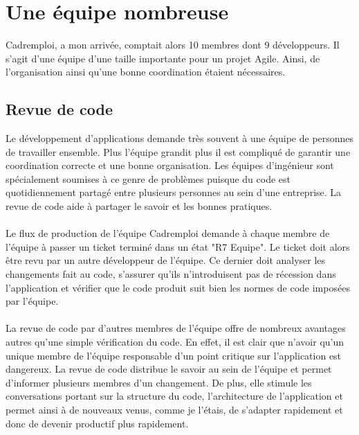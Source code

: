 \section{Une équipe nombreuse}
\label{sec:Une équipe nombreuse}
Cadremploi, a mon arrivée, comptait alors 10 membres dont 9 développeurs.
Il s'agit d'une équipe d'une taille importante pour un projet Agile.
Ainsi, de l'organisation ainsi qu'une bonne coordination étaient nécessaires.

\subsection{Revue de code}
\label{sub:Revue de code}
Le développement d'applications demande très souvent à une équipe de personnes de travailler ensemble.
Plus l'équipe grandit plus il est compliqué de garantir une coordination correcte et une bonne organisation.
Les équipes d'ingénieur sont spécialement soumises à ce genre de problèmes puisque du code est quotidiennement partagé entre plusieurs personnes au sein d'une entreprise.
La revue de code aide à partager le savoir et les bonnes pratiques.
\paragraph{}
Le flux de production de l'équipe Cadremploi demande à chaque membre de l'équipe à passer un ticket terminé dans un état "R7 Equipe".
Le ticket doit alors être revu par un autre développeur de l'équipe.
Ce dernier doit analyser les changements fait au code, s'assurer qu'ils n'introduisent pas de récession dans l'application et vérifier que le code produit suit bien les normes de code imposées par l'équipe.
\paragraph{}
La revue de code par d'autres membres de l'équipe offre de nombreux avantages autres qu'une simple vérification du code.
En effet, il est clair que n'avoir qu'un unique membre de l'équipe responsable d'un point critique sur l'application est dangereux.
La revue de code distribue le savoir au sein de l'équipe et permet d'informer plusieurs membres d'un changement.
De plus, elle stimule les conversations portant sur la structure du code, l'architecture de l'application et permet ainsi à de nouveaux venus, comme je l'étais, de s'adapter rapidement et donc de devenir productif plus rapidement.
